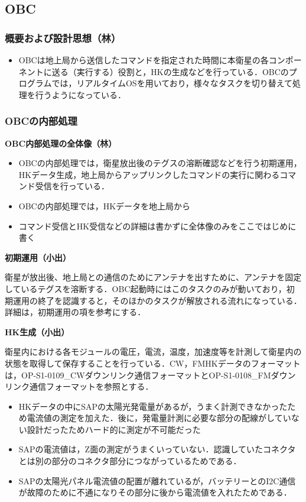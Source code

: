 
\subsection{OBC}
\subsubsection{概要および設計思想（林）}
\begin{itemize}
	\item OBCは地上局から送信したコマンドを指定された時間に本衛星の各コンポーネントに送る（実行する）役割と，HKの生成などを行っている．OBCのプログラムでは，リアルタイムOSを用いており，様々なタスクを切り替えて処理を行うようになっている．
\end{itemize}
\subsubsection{OBCの内部処理}
\textbf{OBC内部処理の全体像（林）}\par
\begin{itemize}
	\item OBCの内部処理では，衛星放出後のテグスの溶断確認などを行う初期運用，HKデータ生成，地上局からアップリンクしたコマンドの実行に関わるコマンド受信を行っている．
	\item OBCの内部処理では，HKデータを地上局から
	\item コマンド受信とHK受信などの詳細は書かずに全体像のみをここではじめに書く
\end{itemize}\par
\textbf{初期運用（小出）}\par
衛星が放出後、地上局との通信のためにアンテナを出すために、アンテナを固定しているテグスを溶断する．OBC起動時にはこのタスクのみが動いており，初期運用の終了を認識すると，そのほかのタスクが解放される流れになっている．
詳細は，初期運用の項を参考にする．\par
\textbf{HK生成（小出）}\par
衛星内における各モジュールの電圧，電流，温度，加速度等を計測して衛星内の状態を取得して保存することを行っている．CW，FMHKデータのフォーマットは，OP-S1-0109\_CWダウンリンク通信フォーマットとOP-S1-0108\_FMダウンリンク通信フォーマットを参照とする．
\begin{itemize}
	\item HKデータの中にSAPの太陽光発電量があるが，うまく計測できなかったため電流値の測定を加えた．後に，発電量計測に必要な部分の配線がしていない設計だったためハード的に測定が不可能だった
	\item SAPの電流値は，Z面の測定がうまくいっていない．認識していたコネクタとは別の部分のコネクタ部分につながっているためである．
	\item SAPの太陽光パネル電流値の配置が離れているが，バッテリーとのI2C通信が故障のために不通になりその部分に後から電流値を入れたためである．
\end{itemize}
